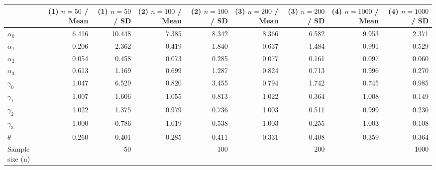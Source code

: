 
\begin{tabular}[t]{lrrrrrrrr}
\toprule
  & (1) $n=50$ / Mean & (1) $n=50$ / SD & (2) $n=100$ / Mean & (2) $n=100$ / SD & (3) $n=200$ / Mean & (3) $n=200$ / SD & (4) $n=1000$ / Mean & (4) $n=1000$ / SD\\
\midrule
$\alpha_{0}$ & 6.416 & 10.448 & 7.385 & 8.342 & 8.366 & 6.582 & 9.953 & 2.371\\
$\alpha_{1}$ & 0.206 & 2.362 & 0.419 & 1.840 & 0.637 & 1.484 & 0.991 & 0.529\\
$\alpha_{2}$ & 0.054 & 0.458 & 0.073 & 0.285 & 0.077 & 0.161 & 0.097 & 0.060\\
$\alpha_{3}$ & 0.613 & 1.169 & 0.699 & 1.287 & 0.824 & 0.713 & 0.996 & 0.270\\
$\gamma_{0}$ & 1.047 & 6.529 & 0.820 & 3.455 & 0.794 & 1.742 & 0.745 & 0.985\\
$\gamma_{1}$ & 1.007 & 1.606 & 1.055 & 0.813 & 1.022 & 0.364 & 1.008 & 0.149\\
$\gamma_{2}$ & 1.022 & 1.375 & 0.979 & 0.736 & 1.003 & 0.511 & 0.999 & 0.230\\
$\gamma_{3}$ & 1.000 & 0.786 & 1.019 & 0.538 & 1.003 & 0.255 & 1.003 & 0.108\\
$\theta$ & 0.260 & 0.401 & 0.285 & 0.411 & 0.331 & 0.408 & 0.359 & 0.364\\
Sample size (n) &  & 50 &  & 100 &  & 200 &  & 1000\\
\bottomrule
\end{tabular}
